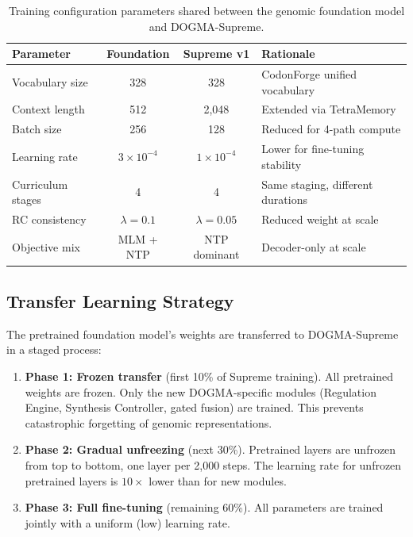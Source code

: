 \begin{table}[H]
\centering
\caption{Training configuration parameters shared between the genomic foundation model and DOGMA-Supreme.}
\label{tab:supreme-config}
\begin{tabularx}{\textwidth}{L{4cm} c c Y}
\toprule
\textbf{Parameter} & \textbf{Foundation} & \textbf{Supreme v1} & \textbf{Rationale} \\
\midrule
Vocabulary size & 328 & 328 & CodonForge unified vocabulary \\
Context length & 512 & 2,048 & Extended via TetraMemory \\
Batch size & 256 & 128 & Reduced for 4-path compute \\
Learning rate & $3 \times 10^{-4}$ & $1 \times 10^{-4}$ & Lower for fine-tuning stability \\
Curriculum stages & 4 & 4 & Same staging, different durations \\
RC consistency & $\lambda = 0.1$ & $\lambda = 0.05$ & Reduced weight at scale \\
Objective mix & MLM + NTP & NTP dominant & Decoder-only at scale \\
\bottomrule
\end{tabularx}
\end{table}

\subsection{Transfer Learning Strategy}

The pretrained foundation model's weights are transferred to DOGMA-Supreme in a staged process:

\begin{enumerate}[leftmargin=1.5em]
  \item \textbf{Phase 1: Frozen transfer} (first 10\% of Supreme training). All pretrained weights are frozen. Only the new DOGMA-specific modules (Regulation Engine, Synthesis Controller, gated fusion) are trained. This prevents catastrophic forgetting of genomic representations.
  \item \textbf{Phase 2: Gradual unfreezing} (next 30\%). Pretrained layers are unfrozen from top to bottom, one layer per 2,000 steps. The learning rate for unfrozen pretrained layers is $10\times$ lower than for new modules.
  \item \textbf{Phase 3: Full fine-tuning} (remaining 60\%). All parameters are trained jointly with a uniform (low) learning rate.
\end{enumerate}

